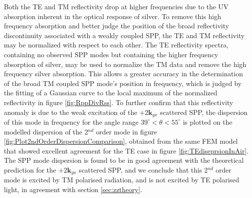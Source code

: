 Both the TE and TM reflectivity drop at higher frequencies due to the UV absorption inherent in the optical response of silver. To remove this high frequency absorption and better judge the position of the broad reflectivity discontinuity associated with a weakly coupled SPP, the TE and TM reflectivity may be normalized with respect to each other. The TE reflectivity spectra, containing no observed SPP modes but containing the higher frequency absorption of silver, may be used to normalize the TM data and remove the high frequency silver absorption. This allows a greater accuracy in the determination of the broad TM coupled SPP mode's position in frequency, which is judged by the fitting of a Gaussian curve to the local maximum of the normalized reflectivity in figure \ref{fig:RppDivRss}.  To further confirm that this reflectivity anomaly is due to the weak excitation of the $+2\mathbf{k}_{gx}$ scattered SPP, the dispersion of this mode in frequency for the angle range $39^\circ<\theta<55^\circ$ is plotted on the modelled dispersion of the 2$^{nd}$ order mode in figure \ref{fig:Plot2ndOrderDispersionComparison}, obtained from the same FEM model that showed excellent agreement for the TE case in figure \ref{fig:TEdiseprsionInAir}. The SPP mode dispersion is found to be in good agreement with the theoretical prediction for the $+2\mathbf{k}_{gx}$ scattered SPP, and we conclude that this 2$^{nd}$ order mode is excited by TM polarised radiation, and is not excited by TE polarised light, in agreement with section \ref{sec:zztheory}.


